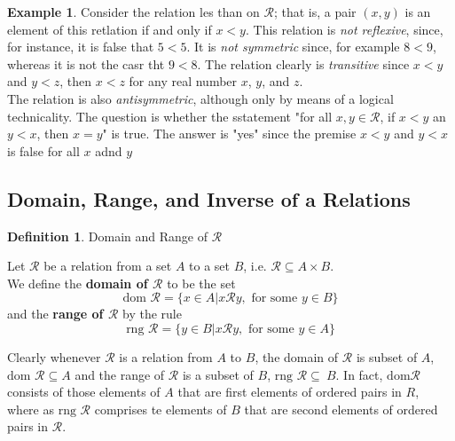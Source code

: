 \documentclass{book}
\theoremstyle{definition}
\newtheorem{definition}{Definition}[section]
\newtheorem{example}{Example}[definition]
\theoremstyle{remark}
\newcommand{\cc}[1]{\mathcal{#1}}
\begin{document}
    \begin{example}
        Consider the relation les than on $\cc{R}$; that is, a pair $(x,y)$ is an element of this retlation if and only if $x < y$. This relation is \textit{not reflexive}, since, for  instance, it is false that $5 < 5$. It is \textit{not symmetric} since, for example $8 < 9$, whereas it is not the casr tht $9 < 8$. The relation clearly is \textit{transitive} since $x < y$ and $y < z$, then $x < z$ for any real number $x$, $y$, and $z$. \\
        
        The relation is also \textit{antisymmetric}, although only by means of a logical technicality. The question is whether the sstatement "for all $x,y \in \cc{R}$, if $x < y$ an $y < x$, then $x=y$" is true. The answer is "yes" since the premise $x < y$ and $y < x$ is false for all $x$ adnd $y$
    \end{example}


\newpage
\subsection{Domain, Range, and Inverse of a Relations}   
    
    \begin{definition} 
        Domain and Range of $\cc{R}$ \\
        
        \begin{tcolorbox}      
            Let $\cc{R}$ be a relation from a set $A$ to a set $B$, i.e. $\cc{R} \subseteq A \times B$. \\
            We define the \textbf{domain of $\cc{R}$} to be the set 
                \begin{equation*}
                    \text{dom } \cc{R} = \{ x \in A | x \cc{R} y, \text{ for some } y \in B \}
                \end{equation*}
            and the \textbf{range of $\cc{R}$} by the rule 
                \begin{equation*}
                    \text{rng } \cc{R} = \{ y \in B | x \cc{R} y, \text{ for some } y \in A \}
                \end{equation*}
        \end{tcolorbox}
    \end{definition}

    
    Clearly whenever $\cc{R}$ is a relation from $A$ to $B$, the domain of $\cc{R}$ is subset of $A$, $\text{dom } \cc{R} \subseteq A$ and the range of $\cc{R}$ is a subset of $B$, $\text{rng } \cc{R} \subseteq\ B$. In fact, $\text{dom} \cc{R}$ consists of those elements of $A$ that are first elements of ordered pairs in $R$, where as $\text{rng } \cc{R}$ comprises te elements of $B$ that are second elements of ordered pairs in $\cc{R}$. 
\end{document}
